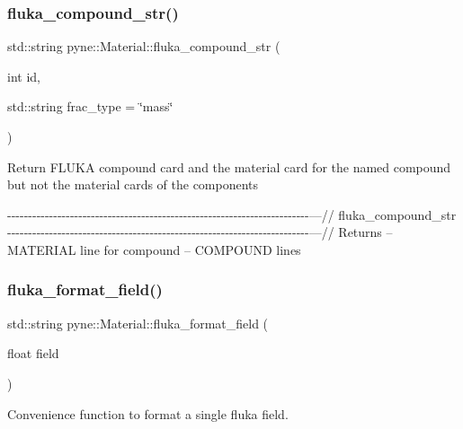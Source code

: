 \subsubsection{\texorpdfstring{fluka\+\_\+compound\+\_\+str()}{fluka\_compound\_str()}}
{\footnotesize\ttfamily std\+::string pyne\+::\+Material\+::fluka\+\_\+compound\+\_\+str (\begin{DoxyParamCaption}\item[{int}]{id,  }\item[{std\+::string}]{frac\+\_\+type = {\ttfamily \char`\"{}mass\char`\"{}} }\end{DoxyParamCaption})}

Return F\+L\+U\+KA compound card and the material card for the named compound but not the material cards of the components

-\/-\/-\/-\/-\/-\/-\/-\/-\/-\/-\/-\/-\/-\/-\/-\/-\/-\/-\/-\/-\/-\/-\/-\/-\/-\/-\/-\/-\/-\/-\/-\/-\/-\/-\/-\/-\/-\/-\/-\/-\/-\/-\/-\/-\/-\/-\/-\/-\/-\/-\/-\/-\/-\/-\/-\/-\/-\/-\/-\/-\/-\/-\/-\/-\/-\/-\/-\/-\/-\/-\/-\/---// fluka\+\_\+compound\+\_\+str -\/-\/-\/-\/-\/-\/-\/-\/-\/-\/-\/-\/-\/-\/-\/-\/-\/-\/-\/-\/-\/-\/-\/-\/-\/-\/-\/-\/-\/-\/-\/-\/-\/-\/-\/-\/-\/-\/-\/-\/-\/-\/-\/-\/-\/-\/-\/-\/-\/-\/-\/-\/-\/-\/-\/-\/-\/-\/-\/-\/-\/-\/-\/-\/-\/-\/-\/-\/-\/-\/-\/-\/---// Returns -- M\+A\+T\+E\+R\+I\+AL line for compound -- C\+O\+M\+P\+O\+U\+ND lines \mbox{\label{classpyne_1_1_material_ab5fb8d5171b210a7c151d6bb1e180693}} 
\subsubsection{\texorpdfstring{fluka\+\_\+format\+\_\+field()}{fluka\_format\_field()}}
{\footnotesize\ttfamily std\+::string pyne\+::\+Material\+::fluka\+\_\+format\+\_\+field (\begin{DoxyParamCaption}\item[{float}]{field }\end{DoxyParamCaption})}



Convenience function to format a single fluka field. 

